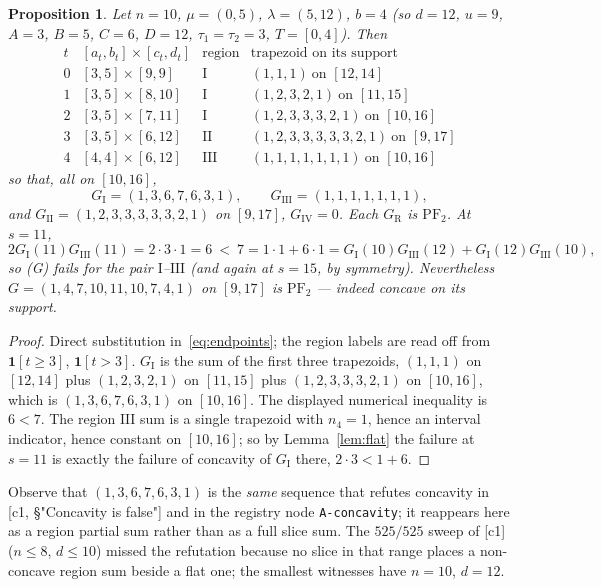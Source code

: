 \documentclass[11pt]{article}
\newtheorem{proposition}[theorem]{Proposition}
\theoremstyle{definition}
\newcommand{\PFtwo}{\mathrm{PF}_2}
\begin{document}
\begin{proposition}\label{prop:witness}
Let $n=10$, $\mu=(0,5)$, $\lambda=(5,12)$, $b=4$ \textup{(}so $d=12$, $u=9$, $A=3$, $B=5$,
$C=6$, $D=12$, $\tau_1=\tau_2=3$, $T=[0,4]$\textup{)}. Then
\[
\begin{array}{c|c|c|c}
 t & [a_t,b_t]\times[c_t,d_t] & \text{region} & \text{trapezoid on its support}\\\hline
 0 & [3,5]\times[9,9]   & \mathrm I   & (1,1,1)\ \text{on }[12,14]\\
 1 & [3,5]\times[8,10]  & \mathrm I   & (1,2,3,2,1)\ \text{on }[11,15]\\
 2 & [3,5]\times[7,11]  & \mathrm I   & (1,2,3,3,3,2,1)\ \text{on }[10,16]\\
 3 & [3,5]\times[6,12]  & \mathrm{II} & (1,2,3,3,3,3,3,2,1)\ \text{on }[9,17]\\
 4 & [4,4]\times[6,12]  & \mathrm{III}& (1,1,1,1,1,1,1)\ \text{on }[10,16]
\end{array}
\]
so that, all on $[10,16]$,
\[
  G_{\mathrm I}=(1,3,6,7,6,3,1),\qquad G_{\mathrm{III}}=(1,1,1,1,1,1,1),
\]
and $G_{\mathrm{II}}=(1,2,3,3,3,3,3,2,1)$ on $[9,17]$, $G_{\mathrm{IV}}=0$. Each
$G_{\mathrm R}$ is $\PFtwo$. At $s=11$,
\[
  2G_{\mathrm I}(11)G_{\mathrm{III}}(11)=2\cdot3\cdot1=6
  \ <\ 7=1\cdot1+6\cdot1
  =G_{\mathrm I}(10)G_{\mathrm{III}}(12)+G_{\mathrm I}(12)G_{\mathrm{III}}(10),
\]
so \textup{(G)} fails for the pair $\mathrm I$--$\mathrm{III}$ \textup{(}and again at
$s=15$, by symmetry\textup{)}. Nevertheless
$G=(1,4,7,10,11,10,7,4,1)$ on $[9,17]$ is $\PFtwo$ --- indeed concave on its support.
\end{proposition}
\begin{proof}
Direct substitution in~\eqref{eq:endpoints}; the region labels are read off from
$\mathbf 1[t\ge3]$, $\mathbf 1[t>3]$. $G_{\mathrm I}$ is the sum of the first three
trapezoids, $(1,1,1)$ on $[12,14]$ plus $(1,2,3,2,1)$ on $[11,15]$ plus
$(1,2,3,3,3,2,1)$ on $[10,16]$, which is $(1,3,6,7,6,3,1)$ on $[10,16]$. The displayed
numerical inequality is $6<7$. The region $\mathrm{III}$ sum is a single trapezoid with
$n_4=1$, hence an interval indicator, hence constant on $[10,16]$; so by
Lemma~\ref{lem:flat} the failure at $s=11$ is exactly the failure of concavity of
$G_{\mathrm I}$ there, $2\cdot3<1+6$.
\end{proof}

Observe that $(1,3,6,7,6,3,1)$ is the \emph{same} sequence that refutes concavity in
[c1, §"Concavity is false"] and in the registry node \texttt{A-concavity}; it reappears here
as a region partial sum rather than as a full slice sum. The $525/525$ sweep of [c1]
($n\le8$, $d\le10$) missed the refutation because no slice in that range places a
non-concave region sum beside a flat one; the smallest witnesses have $n=10$, $d=12$.
\end{document}
